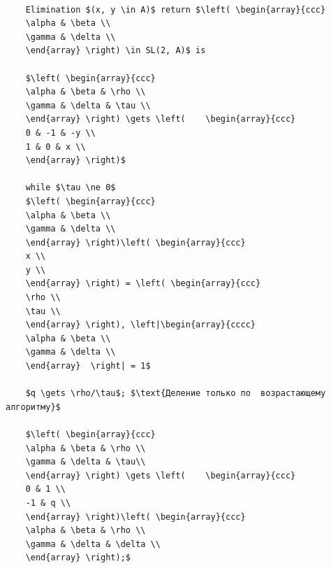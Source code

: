 \documentclass{mai_book}
\begin{document}
\begin{lstlisting}[mathescape=true]

    Elimination $(x, y \in A)$ return $\left( \begin{array}{ccc}
    \alpha & \beta \\
    \gamma & \delta \\
    \end{array} \right) \in SL(2, A)$ is

    $\left( \begin{array}{ccc}
    \alpha & \beta & \rho \\
    \gamma & \delta & \tau \\
    \end{array} \right) \gets \left(    \begin{array}{ccc}
    0 & -1 & -y \\
    1 & 0 & x \\
    \end{array} \right)$

    while $\tau \ne 0$ 
    $\left( \begin{array}{ccc}
    \alpha & \beta \\
    \gamma & \delta \\
    \end{array} \right)\left( \begin{array}{ccc}
    x \\
    y \\
    \end{array} \right) = \left( \begin{array}{ccc}
    \rho \\
    \tau \\
    \end{array} \right), \left|\begin{array}{cccc}
    \alpha & \beta \\
    \gamma & \delta \\
    \end{array}  \right| = 1$

    $q \gets \rho/\tau$; $\text{Деление только по  возрастающему алгоритму}$

    $\left( \begin{array}{ccc}
    \alpha & \beta & \rho \\
    \gamma & \delta & \tau\\
    \end{array} \right) \gets \left(    \begin{array}{ccc}
    0 & 1 \\
    -1 & q \\
    \end{array} \right)\left( \begin{array}{ccc}
    \alpha & \beta & \rho \\
    \gamma & \delta & \delta \\
    \end{array} \right);$
    

\end{lstlisting}
\end{document}
